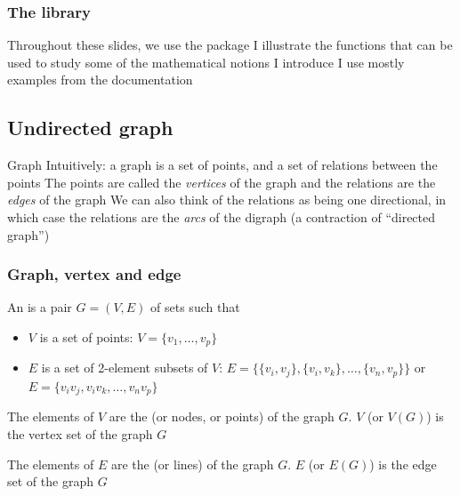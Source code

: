 \documentclass[aspectratio=169]{beamer}\usepackage[]{graphicx}\usepackage[]{xcolor}
\begin{document}
\begin{frame}\frametitle{The  library}
Throughout these slides, we use the package 
\vfill
I illustrate the functions that can be used to study some of the mathematical notions I introduce
\vfill
I use mostly examples from the  documentation
\end{frame}


\subsection{Undirected graph}


\begin{frame}{Graph}
	Intuitively: a graph is a set of points, and a set of relations between the points
	\vfill
	The points are called the \emph{vertices} of the graph and the relations are the \emph{edges} of the graph
	\vfill
	We can also think of the relations as being one directional, in which case the relations are the \emph{arcs} of the digraph (a contraction of ``directed graph'')
\end{frame}


\begin{frame}\frametitle{Graph, vertex and edge} 
	\begin{definition}[Graph]
	An  is a pair $G=(V,E)$ of sets such that
	\begin{itemize}
	\item $V$ is a set of points:  $V=\{v_1,\ldots,v_p\}$
	\item $E$ is a set of 2-element subsets of $V$: $E=\{\{v_i,v_j\},\{v_i,v_k\},\ldots,\{v_n,v_p\}\}$ or $E=\{v_iv_j,v_iv_k,\ldots,v_nv_p\}$
	\end{itemize}
	\end{definition}
	\begin{definition}[Vertex]
	The elements of $V$ are the  (or nodes, or points) of the graph $G$.
	$V$ (or $V(G)$) is the vertex set of the graph $G$
	\end{definition}
	\begin{definition}[Edge]
	The elements of $E$ are the  (or lines) of the graph $G$.
	$E$ (or $E(G)$) is the edge set of the graph $G$
	\end{definition}
\end{frame}
\end{document}
